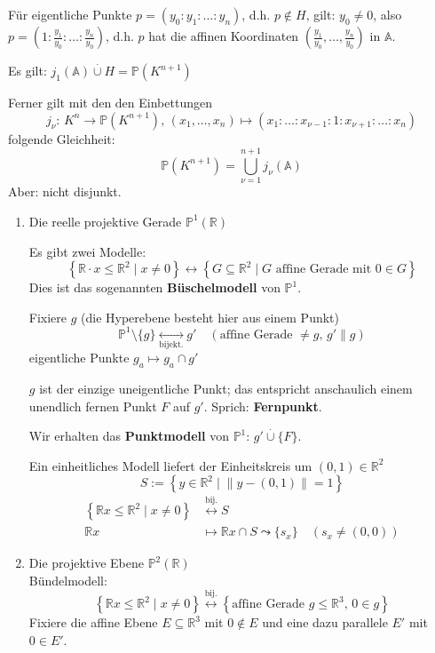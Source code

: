 \documentclass[parskip,a4paper,twoside,DIV15,BCOR12mm]{scrbook}
\begin{document}
Für eigentliche Punkte \(p=(y_{0}:y_{1}:\ldots:y_{n})\), d.h. \(p\not\in H\),
gilt: \(y_{0}\neq0\), also 
\(p=\left(1:\frac{y_{1}}{y_{0}}:\ldots:\frac{y_{n}}{y_{0}}\right)\), d.h. \(p\)
hat die affinen Koordinaten 
    \(\left(\frac{y_{1}}{y_{0}},\ldots,\frac{y_{n}}{y_{0}}\right)\) in 
\(\mathbb{A}\).

Es gilt: \(j_{1}(\mathbb{A})\overset{\cdot}{\cup}H=\mathbb{P}(K^{n+1})\)

Ferner gilt mit den den Einbettungen
\[
j_{\nu}:\,K^{n}\to\mathbb{P}(K^{n+1}),\,
    (x_{1},\ldots,x_{n})\mapsto(x_{1}:\ldots:x_{\nu-1}:1:x_{\nu+1}:\ldots:x_{n})
\]
folgende Gleichheit:
\[
\mathbb{P}(K^{n+1})=\bigcup_{\nu=1}^{n+1}{j_{\nu}(\mathbb{A})}
\]
Aber: nicht disjunkt.
\begin{example}
\begin{enumerate}
\item Die reelle projektive Gerade \(\mathbb{P}^{1}(\mathbb{R})\)

Es gibt zwei Modelle:
\[
\left\{\mathbb{R}\cdot x\leq\mathbb{R}^{2}\mid x\neq0\right\}\longleftrightarrow
\left\{G\subseteq\mathbb{R}^{2}\mid G\text{ affine Gerade mit }0\in G\right\}
\]
Dies ist das sogenannten \textbf{Büschelmodell} von \(\mathbb{P}^{1}\).

Fixiere \(g\) (die Hyperebene besteht hier aus einem Punkt)
\[
\mathbb{P}^{1}\setminus\{g\}\underset{\text{bijekt.}}{\longleftrightarrow}g'
\quad(\text{affine Gerade }\neq g,\,g'\parallel g)
\]
eigentliche Punkte \(g_{a}\mapsto g_{a}\cap g'\)

\(g\) ist der einzige uneigentliche Punkt; das entspricht anschaulich einem
unendlich fernen Punkt \(F\) auf \(g'\). Sprich: \textbf{Fernpunkt}.

Wir erhalten das \textbf{Punktmodell} von 
\(\mathbb{P}^{1}:\,g'\overset{\cdot}{\cup}\{F\}\).

Ein einheitliches Modell liefert der Einheitskreis um \((0,1)\in\mathbb{R}^{2}\)
\[
S:=\left\{y\in\mathbb{R}^{2}\mid \lVert y-(0,1)\rVert=1\right\}
\]
\begin{align*}
\left\{\mathbb{R}x\leq\mathbb{R}^{2}\mid x\neq0\right\}
    &\overset{\text{bij.}}{\longleftrightarrow}S\\
\mathbb{R}x&\mapsto\mathbb{R}x\cap S\leadsto\{s_{x}\}\quad(s_{x}\neq(0,0))
\end{align*}
\item Die projektive Ebene \(\mathbb{P}^{2}(\mathbb{R})\)\\
Bündelmodell:
\[
\left\{\mathbb{R}x\leq\mathbb{R}^{2}\mid x\neq0\right\}
    \overset{\text{bij.}}{\longleftrightarrow}
    \left\{\text{affine Gerade }g\leq\mathbb{R}^{3},\,0\in g\right\}
\]
Fixiere die affine Ebene \(E\subseteq\mathbb{R}^{3}\) mit \(0\not\in E\) und
eine dazu parallele \(E'\) mit \(0\in E'\).


\end{enumerate}
\end{example}
\end{document}
